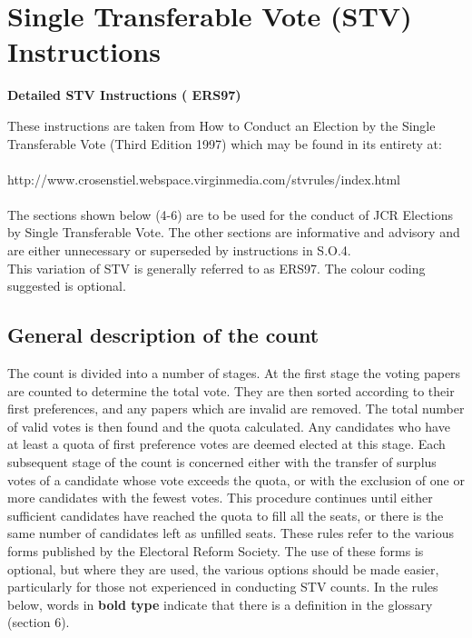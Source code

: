 \chapter{Single Transferable Vote (STV) Instructions}

\textbf{Detailed STV Instructions ( ERS97)}

These instructions are taken from How to Conduct an Election by the Single Transferable Vote (Third Edition 1997) which may be found in its entirety at: \\ \\ http://www.crosenstiel.webspace.virginmedia.com/stvrules/index.html \\ \\
The sections shown below (4-6) are to be used for the conduct of JCR Elections by Single Transferable Vote.  The other sections are informative and advisory and are either unnecessary or superseded by instructions in S.O.4. \\
This variation of STV is generally referred to as ERS97. The colour coding suggested is optional. \\

\section{General description of the count}
\appnpara The count is divided into a number of stages. At the first stage the voting papers are counted to determine the total vote. They are then sorted according to their first preferences, and any papers which are invalid are removed. The total number of valid votes is then found and the quota calculated. Any candidates who have at least a quota of first preference votes are deemed elected at this stage.
\appnpara Each subsequent stage of the count is concerned either with the transfer of surplus votes of a candidate whose vote exceeds the quota, or with the exclusion of one or more candidates with the fewest votes.
\appnpara This procedure continues until either sufficient candidates have reached the quota to fill all the seats, or there is the same number of candidates left as unfilled seats.
\appnpara These rules refer to the various forms published by the Electoral Reform Society. The use of these forms is optional, but where they are used, the various options should be made easier, particularly for those not experienced in conducting STV counts.
\appnpara In the rules below, words in \textbf{bold type} indicate that there is a definition in the glossary (section 6).

